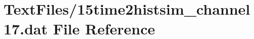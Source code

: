 \hypertarget{15time2histsim__channel17_8dat}{}\section{Text\+Files/15time2histsim\+\_\+channel17.dat File Reference}
\label{15time2histsim__channel17_8dat}
